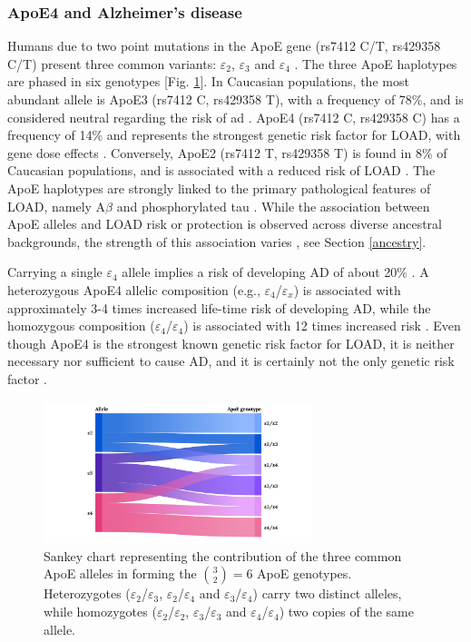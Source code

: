 \documentclass{amsart}
\begin{document}
\subsubsection{ApoE4 and Alzheimer's disease}
Humans due to two point mutations in the ApoE gene (rs7412 C/T, rs429358 C/T) present three common variants: $\varepsilon_2$, $\varepsilon_3$ and $\varepsilon_4$ \cite{Husain2021APOETherapeutics, Yang2023ApolipoproteinDisease}. The three ApoE haplotypes are phased in six genotypes [Fig. \ref{fig1}]. In Caucasian populations, the most abundant allele is ApoE3 (rs7412 C, rs429358 T), with a frequency of 78\%, and is considered neutral regarding the risk of \acrshort{ad} \cite{Liu2013ApolipoproteinTherapy}. ApoE4 (rs7412 C, rs429358 C) has a frequency of 14\% and represents the strongest genetic risk factor for LOAD, with gene dose effects \cite{Strittmatter1993ApolipoproteinDisease}. Conversely, ApoE2 (rs7412 T, rs429358 T) is found in 8\% of Caucasian populations, and is associated with a reduced risk of LOAD \cite{Liu2013ApolipoproteinTherapy}. The ApoE haplotypes are strongly linked to the primary pathological features of LOAD, namely A$\beta$ and phosphorylated tau \cite{Deming2017Genome-wideModifiers}. While the association between ApoE alleles and LOAD risk or protection is observed across diverse ancestral backgrounds, the strength of this association varies \cite{Belloy2019AForward, Farrer1997EffectsMeta-analysis}, see Section \ref{ancestry}.

Carrying a single $\varepsilon_4$ allele implies a risk of developing AD of about 20\% \cite{Bookheimer2009APOE4GA}. A heterozygous ApoE4 allelic composition (e.g., $\varepsilon_4$/$\varepsilon_x$) is associated with approximately 3-4 times increased life-time risk of developing AD, while the homozygous composition ($\varepsilon_4$/$\varepsilon_4$) is associated with 12 times increased risk \cite{Kim2009TheRO}. Even though ApoE4 is the strongest known genetic risk factor for LOAD, it is neither necessary nor sufficient to cause AD, and it is certainly not the only genetic risk factor \cite{SerranoPozo2019IsAD}.

\begin{figure}[H]
  \includegraphics[width=0.7\textwidth]{figures/ApoE@2x.png}
    \caption{Sankey chart representing the contribution of the three common ApoE alleles in forming the $\binom{3}{2} = 6$ ApoE genotypes. Heterozygotes ($\varepsilon_2$/$\varepsilon_3$,  $\varepsilon_2$/$\varepsilon_4$ and $\varepsilon_3$/$\varepsilon_4$) carry two distinct alleles, while homozygotes ($\varepsilon_2$/$\varepsilon_2$, $\varepsilon_3$/$\varepsilon_3$ and $\varepsilon_4$/$\varepsilon_4$) two copies of the same allele.}
  \label{fig1}
\end{figure}
\end{document}

